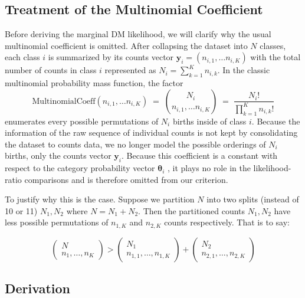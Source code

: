 \subsection{Treatment of the Multinomial Coefficient}
\label{sec:ch2-likelihood-adjustment}

Before deriving the marginal DM likelihood, we will clarify why the usual multinomial coefficient is omitted. After collapsing the dataset into \(N\)  classes, each class \(i\) is summarized by its counts vector \(\mathbf{y}_i = (n_{i,1}, \dots n_{i,K})\) with the total number of counts in class \(i\) represented as \(N_i = \sum_{k=1}^K n_{i,k}\). In the classic multinomial probability mass function, the factor 
\begin{equation*}
    \label{eq:multinomial-coef}
    \mathrm{MultinomialCoeff}(n_{i,1}, \dots n_{i,K})
  \;=\;
        \binom{N_i}{n_{i,1}, \dots n_{i,K}}
 \;=\; 
        \frac{N_i!}{\prod_{k=1}^K n_{i,k}!}
\end{equation*} 
enumerates every possible permutations of \(N_i\) births inside of class \(i\). Because the information of the raw sequence of individual counts is not kept by consolidating the dataset to counts data, we no longer model the possible orderings of \(N_i\) births, only the counts vector \(\mathbf{y}_i\). Because this coefficient is a constant with respect to the category probability vector \(\boldsymbol{\theta}_i\) \parencite{wiki:dirichlet-multinomial}, it plays no role in the likelihood-ratio comparisons and is therefore omitted from our criterion.

To justify why this is the case. Suppose we partition \(N\) into two splits (instead of 10 or 11) \(N_1, N_2\) where \(N = N_1 + N_2\). Then the partitioned counts \(N_1,N_2\) have less possible permutations of \(n_{1,K}\) and \(n_{2,K}\) counts respectively. That is to say: 


\[
     \begin{pmatrix}
         N \\ n_1, \dots, n_K
     \end{pmatrix}
     >
     \begin{pmatrix}
         N_1 \\ n_{1,1}, \dots, n_{1,K}
     \end{pmatrix}
     +
     \begin{pmatrix}
         N_2 \\ n_{2,1}, \dots, n_{2,K}
     \end{pmatrix}
\]


\subsection{Derivation}
\label{sec:ch2-likelihood-derivation}

